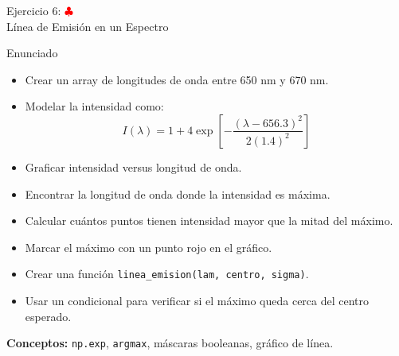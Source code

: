 \documentclass[10pt]{beamer}
\begin{document}
\begin{frame}[shrink=8]{Ejercicio 6: \hfill \textcolor{red}{$\clubsuit$} \\ Línea de Emisión en un Espectro}
  \begin{block}{Enunciado}
    \begin{itemize}
      \item Crear un array de longitudes de onda entre 650 nm y 670 nm.
      \item Modelar la intensidad como:
        \[
          I(\lambda)=1+4\exp\left[-\frac{(\lambda-656.3)^2}{2(1.4)^2}\right]
        \]
      \item Graficar intensidad versus longitud de onda.
      \item Encontrar la longitud de onda donde la intensidad es máxima.
      \item Calcular cuántos puntos tienen intensidad mayor que la mitad del máximo.
      \item Marcar el máximo con un punto rojo en el gráfico.
      \item Crear una función \texttt{linea\_emision(lam, centro, sigma)}.
      \item Usar un condicional para verificar si el máximo queda cerca del centro esperado.
    \end{itemize}
  \end{block}
  \textbf{Conceptos:} \texttt{np.exp}, \texttt{argmax}, máscaras booleanas, gráfico de línea.
\end{frame}
\end{document}

